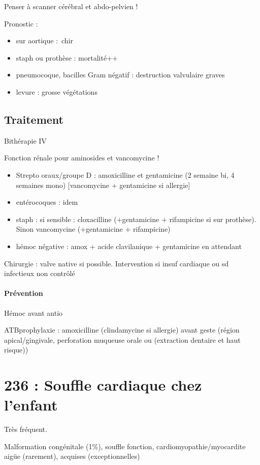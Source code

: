 \documentclass{article}
\begin{document}
Penser à scanner cérébral et abdo-pelvien !

Pronostic : 
\begin{itemize}
  \item sur aortique : chir
  \item staph ou prothèse : mortalité++
  \item pneumocoque, bacilles Gram négatif : destruction valvulaire graves
  \item levure : grosse végétations
\end{itemize}

\subsection{Traitement}
Bithérapie IV

Fonction rénale pour aminosides et vancomycine !

\begin{itemize}
  \item Strepto oraux/groupe D : amoxicilline et gentamicine (2 semaine bi, 4
    semaines mono) [vancomycine + gentamicine si allergie]
  \item entérocoques : idem
  \item staph : si sensible : cloxacilline (+gentamicine + rifampicine si sur
    prothèse). Sinon vancomycine (+gentamicine + rifampicine)
  \item hémoc négative :  amox + acide clavilanique + gentamicine en attendant
\end{itemize}

Chirurgie : valve native si possible. Intervention si insuf cardiaque ou sd
infectieux non contrôlé

\paragraph{Prévention}
Hémoc avant antio \danger

ATBprophylaxie : amoxicilline (clindamycine si allergie) avant geste (région
apical/gingivale, perforation muqueuse orale ou (extraction dentaire et haut
risque))

\section{236 : Souffle cardiaque chez l'enfant}%
\label{sec:236_souffle_cardiaque_chez_l_enfant}
Très fréquent.

Malformation congénitale (1\%), souffle fonction, cardiomyopathie/myocardite
aigüe (rarement), acquises (exceptionnelles)
\end{document}
